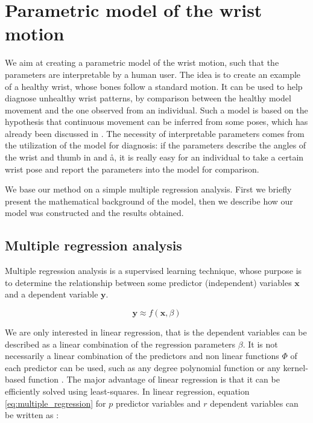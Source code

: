 \clearpage
\section{Parametric model of the wrist motion}

We aim at creating a parametric model of the wrist motion, such that the parameters are interpretable by a human user. The idea is to create an example of a healthy wrist, whose bones follow a standard motion. It can be used to help diagnose unhealthy wrist patterns, by comparison between the healthy model movement and the one observed from an individual. Such a model is based on the hypothesis that continuous movement can be inferred from some poses, which has already been discussed in \cite{foumani_2009_vivo}. 
The necessity of interpretable parameters comes from the utilization of the model for diagnosis: if the parameters describe the angles of the wrist and thumb in \fe* and \aa*, it is really easy for an individual to take a certain wrist pose and report the parameters into the model for comparison. 

We base our method on a simple multiple regression analysis. First we briefly present the mathematical background of the model, then we describe how our model was constructed and the results obtained. 


\subsection{Multiple regression analysis}

Multiple regression analysis is a supervised learning technique, whose purpose is to determine the relationship between some predictor (independent) variables $\mathbf{x}$ and a dependent variable $\mathbf{y}$. 

\begin{equation}
	\mathbf{y} \approx f(\mathbf{x}, \beta)
	\label{eq:multiple_regression}
\end{equation}

We are only interested in linear regression, that is the dependent variables can be described as a linear combination of the regression parameters $\beta$. It is not necessarily a linear combination of the predictors and non linear functions $\Phi$ of each predictor can be used, such as any degree polynomial function or any kernel-based function \cite{zhuang_2017_statistical}. The major advantage of linear regression is that it can be efficiently solved using least-squares. In linear regression, equation \eqref{eq:multiple_regression} for $p$ predictor variables and $r$ dependent variables can be written as : 

